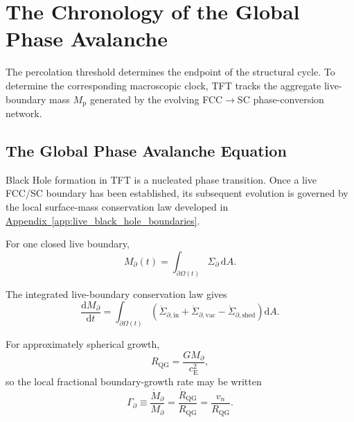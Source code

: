 \section{The Chronology of the Global Phase Avalanche}

The percolation threshold determines the endpoint of the structural cycle.
To determine the corresponding macroscopic clock, TFT tracks the aggregate
live-boundary mass \(M_{\mathrm p}\) generated by the evolving
FCC$\rightarrow$SC phase-conversion network.


\subsection{The Global Phase Avalanche Equation}

Black Hole formation in TFT is a nucleated phase transition. Once a live
FCC/SC boundary has been established, its subsequent evolution is governed by
the local surface-mass conservation law developed in \hyperref[app:live_black_hole_boundaries]{Appendix~\ref*{app:live_black_hole_boundaries}}.

For one closed live boundary,
\begin{equation}
    M_{\partial}(t)
    =
    \int_{\partial\Omega(t)}
    \Sigma_{\partial}\,
    \mathrm dA.
\end{equation}

The integrated live-boundary conservation law gives
\begin{equation}
    \frac{\mathrm dM_{\partial}}{\mathrm dt}
    =
    \int_{\partial\Omega(t)}
    \left(
        \dot\Sigma_{\partial,\mathrm{in}}
        +
        \dot\Sigma_{\partial,\mathrm{vac}}
        -
        \dot\Sigma_{\partial,\mathrm{shed}}
    \right)
    \mathrm dA.
\end{equation}

For approximately spherical growth,
\begin{equation}
    R_{\mathrm{QG}}
    =
    \frac{
        GM_{\partial}
    }{
        c_{\mathrm E}^{2}
    },
\end{equation}
so the local fractional boundary-growth rate may be written
\begin{equation}
    \Gamma_{\partial}
    \equiv
    \frac{
        \dot M_{\partial}
    }{
        M_{\partial}
    }
    =
    \frac{
        \dot R_{\mathrm{QG}}
    }{
        R_{\mathrm{QG}}
    }
    =
    \frac{
        v_n
    }{
        R_{\mathrm{QG}}
    }.
\end{equation}

